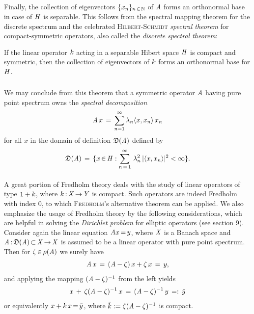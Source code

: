\documentclass[11pt,twoside]{article}
\begin{document}
\begin{itemize}[leftmargin=4mm,itemsep=5pt]
\subparagraph{} %
Finally,
the collection of eigen\-vectors $\{x_n\}_{n {\,\in\,} {\mathbb{N}}}$ of $\mathit{A}$
forms an orthonormal base in case of $\mathit{H}$ is separable.
This follows from the spectral mapping theorem for the discrete spectrum
and the celebrated \textsc{Hilbert-Schmidt} \textit{spectral theorem}
for compact-symmetric operators,
also called the \textit{discrete spectral theorem}:

\begin{theorem1}\label{DISCRETE_SPECTRAL_THEOREM}
If the linear operator $k$
acting in a separable Hibert space $\mathit{H}$
is compact and symmetric,
then the collection of eigen\-vectors of $k$
forms an orthonormal base for $\mathit{H}$.
\end{theorem1}

\subparagraph{} %
We may conclude from this theorem that
a symmetric operator $\mathit{A}$ having pure point spectrum
owns the \textit{spectral decomposition}
\[
\mathit{A} \,x \,=\, \sum_{n=1}^{\infty} \lambda_n \langle x,x_n \rangle \, x_n
\]
for all $x$ in the domain of definition $\mathfrak{D}(\mathit{A})$ defined by
\[
\domain{\linA} \=
\{x \xeof \hilH:
\sum_{n \eq 1}^{\infty} \, \lambda_n^2 \, \abs{\scalar{x}{x_n}} ^2 < \infty \}.
\]
\end{itemize}

\paragraph{} %
A great portion of {Fredholm theory} deals
with the study of linear operators of type ${\mathsf{1}}+k$, 
where $k {\,:\,} \mathit{X} {\,\to\,} \mathit{Y}$ is compact.
Such operators are indeed Fredholm with index $0$,
to which \textsc{Fredholm}'s alternative theorem can be applied.
We also emphasize the usage of Fredholm theory by the following considerations,
which are helpful in solving the \textit{Dirichlet problem}
for elliptic operators (see section 9).
Consider again the linear equation $\mathit{A} x {\,=\,} y$,
where $\mathit{X}$ is a Banach space and
$\mathit{A} {\,:\,} \mathfrak{D}(\mathit{A}) {\,\subset\,} \mathit{X} {\,\to\,} \mathit{X}$
is assumed to be a linear operator with pure point spectrum.
Then for $\zeta {\,\in\,} \rho(\mathit{A})$ we surely have
\[
\mathit{A} \,x \,=\, (\mathit{A} -\zeta)\,x + \zeta \,x \,=\, y,
\]
and applying the mapping $(\mathit{A} -\zeta)^{-1}$ from the left yields
\[
x \,+\, \zeta (\mathit{A} - \zeta)^{-1}\,x
\,=\,
(\mathit{A} -\zeta)^{-1}\,y \, =: \, \tilde{y}
\]
or equivalently $x + \tilde{k} \,x {\,=\,} \tilde{y}$,
where $\tilde{k} := \zeta (\mathit{A}-\zeta)^{-1}$ is compact.
\end{document}
